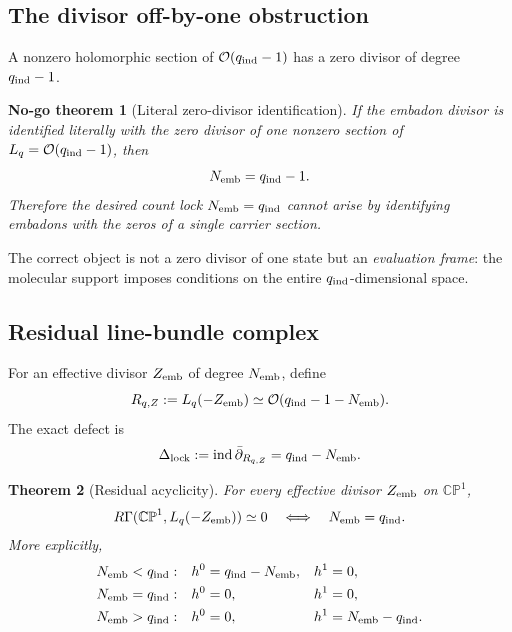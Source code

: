 \documentclass[aps,prd,preprint,nofootinbib,superscriptaddress]{revtex4-2}
\newtheorem{theorem}{Theorem}[section]
\newtheorem{nogotheorem}[theorem]{No-go theorem}
\theoremstyle{definition}
\theoremstyle{remark}
\newcommand{\cO}{\mathcal O}
\newcommand{\ind}{\operatorname{ind}}
\newcommand{\CP}{\mathbb{CP}}
\begin{document}
\subsection{The divisor off-by-one obstruction}

A nonzero holomorphic section of $\cO(q_{\rm ind}-1)$ has a zero divisor of degree $q_{\rm ind}-1$.

\begin{nogotheorem}[Literal zero-divisor identification]
\label{thm:offbyone}
If the embadon divisor is identified literally with the zero divisor of one nonzero section of $L_q=\cO(q_{\rm ind}-1)$, then
\begin{equation}
N_{\rm emb}=q_{\rm ind}-1.
\label{eq:offbyone}
\end{equation}
Therefore the desired count lock $N_{\rm emb}=q_{\rm ind}$ cannot arise by identifying embadons with the zeros of a single carrier section.
\end{nogotheorem}

The correct object is not a zero divisor of one state but an \emph{evaluation frame}: the molecular support imposes conditions on the entire $q_{\rm ind}$-dimensional space.

\subsection{Residual line-bundle complex}

For an effective divisor $Z_{\rm emb}$ of degree $N_{\rm emb}$, define
\begin{equation}
R_{q,Z}
:=
L_q(-Z_{\rm emb})
\simeq
\cO(q_{\rm ind}-1-N_{\rm emb}).
\label{eq:residualbundle}
\end{equation}
The exact defect is
\begin{equation}
\Delta_{\rm lock}
:=
\ind\bar\partial_{R_{q,Z}}
=
q_{\rm ind}-N_{\rm emb}.
\label{eq:deltalock}
\end{equation}

\begin{theorem}[Residual acyclicity]
\label{thm:acyclic}
For every effective divisor $Z_{\rm emb}$ on $\CP^1$,
\begin{equation}
R\Gamma(\CP^1,L_q(-Z_{\rm emb}))\simeq0
\quad\Longleftrightarrow\quad
N_{\rm emb}=q_{\rm ind}.
\label{eq:acyclic}
\end{equation}
More explicitly,
\begin{align}
N_{\rm emb}<q_{\rm ind}
&:
&
h^0&=q_{\rm ind}-N_{\rm emb},
&
h^1&=0,
\\
N_{\rm emb}=q_{\rm ind}
&:
&
h^0&=0,
&
h^1&=0,
\\
N_{\rm emb}>q_{\rm ind}
&:
&
h^0&=0,
&
h^1&=N_{\rm emb}-q_{\rm ind}.
\end{align}
\end{theorem}
\end{document}
